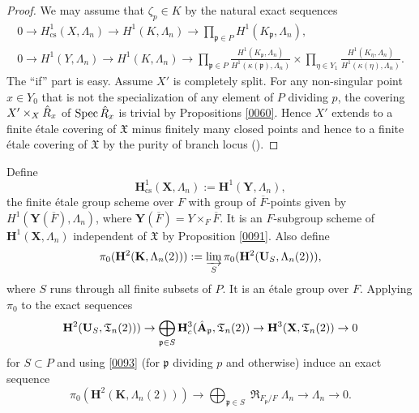 \documentclass{amsart}
\theoremstyle{remark}
\numberwithin{equation}{section}
\newcommand{\closure}[1]{\overline{#1}}
\newcommand{\dirlim}{\varinjlim}
\newcommand{\alg}[1]{\mathbf{#1}}
\newcommand{\ideal}[1]{\mathfrak{#1}}
\newcommand{\cs}{\mathrm{cs}}
\DeclareMathOperator{\Spec}{Spec}
\DeclareMathOperator{\Weil}{\mathfrak{R}}
\begin{document}
\begin{proof}
	We may assume that $\zeta_{p} \in K$ by the natural exact sequences
		\begin{gather*}
					0
				\to
					H^{1}_{\cs}(X, \Lambda_{n})
				\to
					H^{1}(K, \Lambda_{n})
				\to
					\prod_{\ideal{p} \in P}
						H^{1}(K_{\ideal{p}}, \Lambda_{n}),
			\\
					0
				\to
					H^{1}(Y, \Lambda_{n})
				\to
					H^{1}(K, \Lambda_{n})
				\to
						\prod_{\ideal{p} \in P}
							\frac{
								H^{1}(K_{\ideal{p}}, \Lambda_{n})
							}{
								H^{1}(\kappa(\ideal{p}), \Lambda_{n})
							}
					\times
						\prod_{\eta \in Y_{1}}
							\frac{
								H^{1}(K_{\eta}, \Lambda_{n})
							}{
								H^{1}(\kappa(\eta), \Lambda_{n})
							}.
		\end{gather*}
	The ``if'' part is easy.
	Assume $X'$ is completely split.
	For any non-singular point $x \in Y_{0}$ that is not
	the specialization of any element of $P$ dividing $p$,
	the covering $X' \times_{X} \Hat{R}_{x}$ of $\Spec \Hat{R}_{x}$ is trivial
	by Propositions \ref{0060}.
	Hence $X'$ extends to a finite \'etale covering of $\mathfrak{X}$
	minus finitely many closed points and hence to a finite \'etale covering of $\mathfrak{X}$
	by the purity of branch locus (\cite[Tag 0BMA]{Sta22}).
\end{proof}

Define
	\[
			\alg{H}^{1}_{\cs}(\alg{X}, \Lambda_{n})
		:=
			\alg{H}^{1}(\alg{Y}, \Lambda_{n}),
	\]
the finite \'etale group scheme over $F$
with group of $\closure{F}$-points given by
$H^{1}(\alg{Y}(\closure{F}), \Lambda_{n})$,
where $\alg{Y}(\closure{F}) = Y \times_{F} \closure{F}$.
It is an $F$-subgroup scheme of $\alg{H}^{1}(\alg{X}, \Lambda_{n})$
independent of $\mathfrak{X}$
by Proposition \ref{0091}.
Also define
	\[
			\pi_{0}(\alg{H}^{2}(\alg{K}, \Lambda_{n}(2)))
		:=
			\dirlim_{S}
				\pi_{0}(\alg{H}^{2}(\alg{U}_{S}, \Lambda_{n}(2))),
	\]
where $S$ runs through all finite subsets of $P$.
It is an \'etale group over $F$.
Applying $\pi_{0}$ to the exact sequences
	\[
			\alg{H}^{2}(\alg{U}_{S}, \mathfrak{T}_{n}(2)))
		\to
			\bigoplus_{\ideal{p} \in S}
				\alg{H}^{3}_{c}(\Hat{\alg{A}}_{\ideal{p}}, \mathfrak{T}_{n}(2))
		\to
			\alg{H}^{3}(\alg{X}, \mathfrak{T}_{n}(2))
		\to
			0
	\]
for $S \subset P$
and using \eqref{0093}
(for $\ideal{p}$ dividing $p$ and \cite[Theorem 7.2.4]{Suz24} otherwise)
induce an exact sequence
	\begin{equation} \label{0062}
			\pi_{0}(\alg{H}^{2}(\alg{K}, \Lambda_{n}(2)))
		\to
			\bigoplus_{\ideal{p} \in S}
				\Weil_{F_{\ideal{p}} / F}
					\Lambda_{n}
		\to
			\Lambda_{n}
		\to
			0.
	\end{equation}
	
\end{document}
